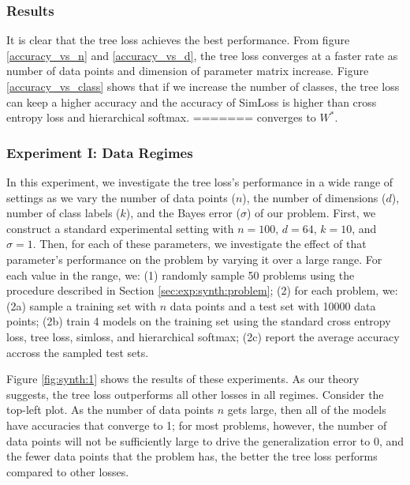 \documentclass[twoside]{article}
\newcommand{\fixme}[1]{}
\begin{document}
\subsubsection{Results}
It is clear that the tree loss achieves the best performance. 
From figure \ref{accuracy_vs_n} and \ref{accuracy_vs_d}, the tree loss converges at a faster rate as number of data points and dimension of parameter matrix increase.
Figure \ref{accuracy_vs_class} shows that if we increase the number of classes, the tree loss can keep a higher accuracy and the accuracy of SimLoss is higher than cross entropy loss and hierarchical softmax.
=======
converges to $W^*$.


\subsubsection{Experiment I: Data Regimes}

In this experiment, we investigate the tree loss's performance in a wide range of settings as we vary the number of data points ($n$), the number of dimensions ($d$), number of class labels ($k$), and the Bayes error ($\sigma$) of our problem.
First, we construct a standard experimental setting with $n=100$, $d=64$, $k=10$, and $\sigma=1$.
Then, for each of these parameters, we investigate the effect of that parameter's performance on the problem by varying it over a large range.
For each value in the range, we:
(1) randomly sample 50 problems using the procedure described in Section \ref{sec:exp:synth:problem};
(2) for each problem, we:
(2a) sample a training set with $n$ data points and a test set with 10000 data points;
(2b) train 4 models on the training set using the standard cross entropy loss, tree loss, simloss, and hierarchical softmax;
(2c) report the average accuracy accross the sampled test sets.

Figure \ref{fig:synth:1} shows the results of these experiments.
As our theory suggests, the tree loss outperforms all other losses in all regimes.
Consider the top-left plot.
As the number of data points $n$ gets large,
then all of the models have accuracies that converge to 1;
for most problems, however, the number of data points will not be sufficiently large to drive the generalization error to 0,
and the fewer data points that the problem has,
the better the tree loss performs compared to other losses.

\fixme{
From figure \ref{fig.1}, it is clear that the tree loss achieves the best performance. 
The tree loss converges at a faster rate as number of data points and dimension of parameter matrix increase.
If we increase the number of classes, the tree loss can keep a higher accuracy and the accuracy of SimLoss is higher than cross entropy loss and hierarchical softmax.
>>>>>>> 6ebdbf92f95244db43f83ed072ca2b7e89ea1aae
It is as our expected, the tree loss can improve performance on large classes tasks.
From figure \ref{accuracy_vs_sigma}, we can see that when we increase the noise in the dataset, the accuracy of all loss functions decrease, yet the tree loss decreases slower.
Among the four loss functions, hierarchical softmax hurts the performance obviously. 
We would not apply hierarchical softmax on real world data experiment in terms of computation.
}
\end{document}
